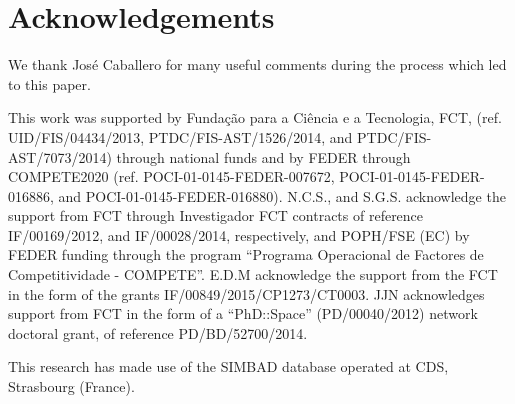 \documentclass[a4paper,fleqn,usenatbib]{mnras}
\begin{document}
% 

\section*{Acknowledgements}



% 
We thank Jos\'e Caballero for many useful comments during the process which led to this paper.

This work was supported by Funda\c{c}\~ao para a Ci\^encia e a Tecnologia, FCT, (ref.
UID/FIS/04434/2013, PTDC/FIS-AST/1526/2014, and PTDC/FIS-AST/7073/2014) through national funds and
by FEDER through COMPETE2020 (ref. POCI-01-0145-FEDER-007672, POCI-01-0145-FEDER-016886, and
POCI-01-0145-FEDER-016880). N.C.S., and S.G.S. acknowledge the support from FCT through Investigador
FCT contracts of reference IF/00169/2012, and IF/00028/2014, respectively, and POPH/FSE (EC) by
FEDER funding through the program “Programa Operacional de Factores de Competitividade - COMPETE”.
E.D.M acknowledge the support from the FCT in the form of the grants IF/00849/2015/CP1273/CT0003.
JJN acknowledges support from FCT in the form of a “PhD::Space” (PD/00040/2012) network doctoral
grant, of reference PD/BD/52700/2014.

This research has made use of the SIMBAD database operated at CDS, Strasbourg (France).
% 








\end{document}
